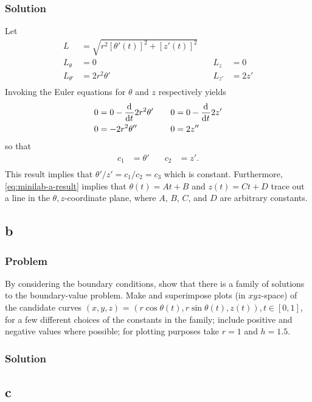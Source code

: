 \documentclass[12pt,twoside]{article}
\begin{document}
\subsubsection*{Solution}
Let
\begin{align*}
  L &= \sqrt{r^2{[\theta'(t)]}^2 + {[z'(t)]}^2} \\
  L_{\theta} &= 0 &\quad L_{z} &= 0 \\
  L_{\theta'} &= 2r^2\theta' &\quad L_{z'} &= 2z' \\
\end{align*}
Invoking the Euler equations for $\theta$ and $z$ respectively yields
\begin{align*}
  0 &= 0 - \frac{\mathrm{d}^{} {}}{\mathrm{d}{t}^{}}2r^2\theta' &\quad 0 &= 0 - \frac{\mathrm{d}^{} {}}{\mathrm{d}{t}^{}}2z' \\
  0 &= -2r^2\theta'' &\quad 0 &= 2z'' \\
\end{align*}
so that
\begin{equation}
  \label{eq:minilab-a-result}
  \begin{aligned}
    c_1 &= \theta' &\quad c_2 &= z'. \\
  \end{aligned}
\end{equation}
This result implies that $\theta'/z'=c_1/c_2=c_3$ which is constant.
Furthermore, \cref{eq:minilab-a-result} implies that $\theta(t)=At+B$ and
$z(t)=Ct+D$ trace out a line in the $\theta,z$-coordinate plane, where $A$, $B$,
$C$, and $D$ are arbitrary constants.
\subsection{b}
\subsubsection*{Problem}
By considering the boundary conditions, show that there is a family of solutions
to the boundary-value problem. Make and superimpose plots (in $xyz$-space) of
the candidate curves $(x,y,z)$ = $(r\cos\theta(t),r\sin\theta(t),z(t)), t\in[0,1]$,
for a few different choices of the constants in the family; include positive and
negative values where possible; for plotting purposes take $r = 1$ and $h =
1.5$.

\subsubsection*{Solution}
\todo{}

\subsection{c}
\end{document}
